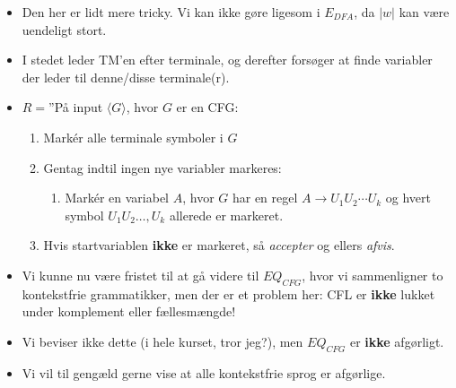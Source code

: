 \begin{frame}[allowframebreaks]
	\begin{itemize}
		\item Den her er lidt mere tricky. Vi kan ikke gøre ligesom i $E_{DFA}$, da $|w|$ kan være uendeligt stort.
		\item I stedet leder TM'en efter terminale, og derefter forsøger at finde variabler der leder til denne/disse terminale(r).
		\item $R = $''På input \(\langle G \rangle\), hvor $G$ er en CFG:
		      \begin{enumerate}
			      \item Markér alle terminale symboler i $G$
			      \item Gentag indtil ingen nye variabler markeres:
			            \begin{enumerate}
				            \item Markér en variabel $A$, hvor $G$ har en regel $A \rightarrow U_{1}U_{2} \cdots U_{k}$ og hvert symbol $U_{1}U_{2} \ldots, U_{k}$  allerede er markeret.
			            \end{enumerate}
			      \item Hvis startvariablen \textbf{ikke} er markeret, så \textit{accepter} og ellers \textit{afvis}.
		      \end{enumerate}
	\end{itemize}

	\begin{itemize}
		\item Vi kunne nu være fristet til at gå videre til $EQ_{CFG}$, hvor vi sammenligner to kontekstfrie grammatikker, men der er et problem her: CFL er \textbf{ikke} lukket under komplement eller fællesmængde!
		\item Vi beviser ikke dette (i hele kurset, tror jeg?), men $EQ_{CFG}$ er \textbf{ikke} afgørligt.
		\item Vi vil til gengæld gerne vise at alle kontekstfrie sprog er afgørlige.
	\end{itemize}


\end{frame}
